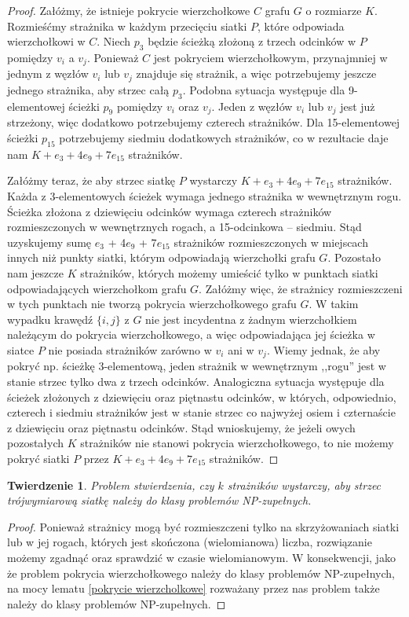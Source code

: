 \documentclass[brudnopis]{xmgr}
\newtheorem{Twierdzenie}{Twierdzenie}
\theoremstyle{definition}
\begin{document}
\begin{proof} 
	Załóżmy, że istnieje pokrycie wierzchołkowe $C$ grafu $G$ o rozmiarze $K$. Rozmieśćmy strażnika w każdym przecięciu siatki $P$, które odpowiada wierzchołkowi w $C$.
	Niech $p_3$ będzie ścieżką złożoną z trzech odcinków w $P$ pomiędzy $v_i$ a $v_j$. Ponieważ $C$ jest pokryciem wierzchołkowym, przynajmniej w jednym z węzłów $v_i$ lub $v_j$ znajduje się strażnik, a więc potrzebujemy jeszcze jednego strażnika, aby strzec całą $p_3$. Podobna sytuacja występuje dla 9-elementowej ścieżki $p_9$ pomiędzy $v_i$ oraz $v_j$. Jeden z węzłów $v_i$ lub $v_j$ jest już strzeżony, więc dodatkowo potrzebujemy czterech strażników. Dla 15-elementowej ścieżki $p_{15}$ potrzebujemy siedmiu dodatkowych strażników, co w rezultacie daje nam $K + e_3 + 4e_9 + 7e_{15}$ strażników.

	\indent Załóżmy teraz, że aby strzec siatkę $P$ wystarczy $K + e_3 + 4e_9 + 7e_{15}$ strażników. Każda z 3-elementowych ścieżek wymaga jednego strażnika w wewnętrznym rogu. Ścieżka złożona z dziewięciu odcinków wymaga czterech strażników rozmieszczonych w wewnętrznych rogach, a 15-odcinkowa -- siedmiu. Stąd uzyskujemy sumę $e_3$ + 4$e_9$ + 7$e_{15}$ strażników rozmieszczonych w miejscach innych niż punkty siatki, którym odpowiadają wierzchołki grafu $G$. Pozostało nam jeszcze $K$ strażników, których możemy umieścić tylko w punktach siatki odpowiadających wierzchołkom grafu $G$. Załóżmy więc, że strażnicy rozmieszczeni w tych punktach nie tworzą pokrycia wierzchołkowego grafu $G$. W takim wypadku krawędź $\{i, j\}$ z $G$ nie jest incydentna z żadnym wierzchołkiem należącym do pokrycia wierzchołkowego, a więc odpowiadająca jej ścieżka w siatce $P$ nie posiada strażników zarówno w $v_i$ ani w $v_j$. Wiemy jednak, że aby pokryć np. ścieżkę 3-elementową, jeden strażnik w wewnętrznym ,,rogu'' jest w stanie strzec tylko dwa z trzech odcinków. Analogiczna sytuacja występuje dla ścieżek złożonych z dziewięciu oraz piętnastu odcinków, w których, odpowiednio, czterech i siedmiu strażników jest w stanie strzec co najwyżej osiem i czternaście z dziewięciu oraz piętnastu odcinków. Stąd wnioskujemy, że jeżeli owych pozostałych $K$ strażników nie stanowi pokrycia wierzchołkowego, to nie możemy pokryć siatki $P$ przez $K + e_3 + 4e_9 + 7e_{15}$ strażników. 
\end{proof}

\begin{Twierdzenie} \cite{ntafos}
  Problem stwierdzenia, czy $k$ strażników wystarczy, aby strzec trójwymiarową siatkę należy do klasy problemów NP-zupełnych.
\end{Twierdzenie}
\begin{proof} 
	Ponieważ strażnicy mogą być rozmieszczeni tylko na skrzyżowaniach siatki lub w jej rogach, których jest skończona (wielomianowa) liczba, rozwiązanie możemy zgadnąć oraz sprawdzić w czasie wielomianowym. W konsekwencji, jako że problem pokrycia wierzchołkowego należy do klasy problemów NP-zupełnych, na mocy lematu \ref{pokrycie wierzcholkowe} rozważany przez nas problem także należy do klasy problemów NP-zupełnych.
\end{proof}
\end{document}
